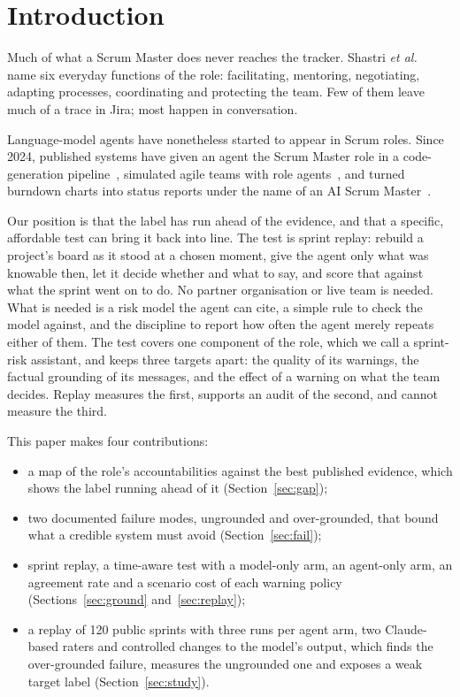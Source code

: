 \documentclass[conference]{IEEEtran}
\begin{document}
\section{Introduction}

Much of what a Scrum Master does never reaches the tracker. Shastri \emph{et al.}~\cite{shastri} name six everyday functions of the role: facilitating, mentoring, negotiating, adapting processes, coordinating and protecting the team. Few of them leave much of a trace in Jira; most happen in conversation.

Language-model agents have nonetheless started to appear in Scrum roles. Since 2024, published systems have given an agent the Scrum Master role in a code-generation pipeline~\cite{agilecoder}, simulated agile teams with role agents~\cite{cognisim}, and turned burndown charts into status reports under the name of an AI Scrum Master~\cite{alliata}.

Our position is that the label has run ahead of the evidence, and that a specific, affordable test can bring it back into line. The test is sprint replay: rebuild a project's board as it stood at a chosen moment, give the agent only what was knowable then, let it decide whether and what to say, and score that against what the sprint went on to do. No partner organisation or live team is needed. What is needed is a risk model the agent can cite, a simple rule to check the model against, and the discipline to report how often the agent merely repeats either of them. The test covers one component of the role, which we call a sprint-risk assistant, and keeps three targets apart: the quality of its warnings, the factual grounding of its messages, and the effect of a warning on what the team decides. Replay measures the first, supports an audit of the second, and cannot measure the third.

This paper makes four contributions:
\begin{itemize}
\item a map of the role's accountabilities against the best published evidence, which shows the label running ahead of it (Section~\ref{sec:gap});
\item two documented failure modes, ungrounded and over-grounded, that bound what a credible system must avoid (Section~\ref{sec:fail});
\item sprint replay, a time-aware test with a model-only arm, an agent-only arm, an agreement rate and a scenario cost of each warning policy (Sections~\ref{sec:ground} and~\ref{sec:replay});
\item a replay of 120 public sprints with three runs per agent arm, two Claude-based raters and controlled changes to the model's output, which finds the over-grounded failure, measures the ungrounded one and exposes a weak target label (Section~\ref{sec:study}).
\end{itemize}
\end{document}
